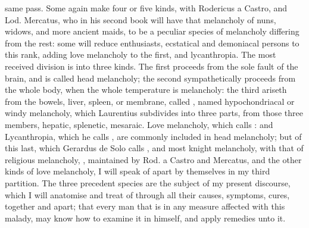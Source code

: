 same pass. Some again make four or five kinds, with Rodericus a Castro,
 and Lod. Mercatus, who
in his second book  will have
that melancholy of nuns, widows, and more ancient maids, to be a peculiar
species of melancholy differing from the rest: some will reduce enthusiasts,
ecstatical and demoniacal persons to this rank, adding
love melancholy to the first, and lycanthropia. The most
received division is into three kinds. The first proceeds from the sole fault
of the brain, and is called head melancholy; the second sympathetically
proceeds from the whole body, when the whole temperature is melancholy: the
third ariseth from the bowels, liver, spleen, or membrane, called
, named hypochondriacal or windy melancholy, which
Laurentius subdivides into three parts, from those three
members, hepatic, splenetic, mesaraic. Love melancholy, which \Avicenna{} calls
: and Lycanthropia, which he calls , are commonly
included in head melancholy; but of this last, which Gerardus de Solo calls
, and most knight melancholy, with that of religious melancholy,
, maintained by Rod. a Castro and Mercatus, and the
other kinds of love melancholy, I will speak of apart by themselves in my third
partition. The three precedent species are the subject of my present discourse,
which I will anatomise and treat of through all their causes, symptoms, cures,
together and apart; that every man that is in any measure affected with this
malady, may know how to examine it in himself, and apply remedies unto it.

